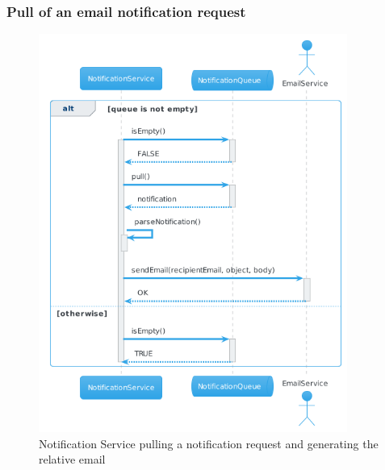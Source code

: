 \subsubsection{Pull of an email notification request}
\begin{figure}[H]
    \hspace{0.3cm}
    \includegraphics[width=0.9\textwidth]{Diagrams/sequence/pull_notification.png}
    \caption{Notification Service pulling a notification request and generating the relative email}
\end{figure}

\newpage
